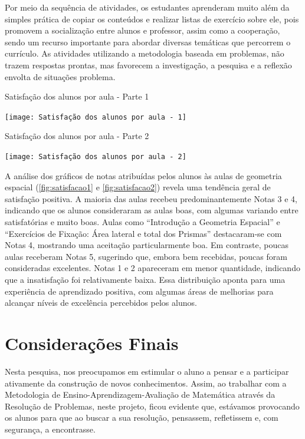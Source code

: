 Por meio da sequência de atividades, os estudantes aprenderam muito além da simples prática de copiar os conteúdos e realizar listas de exercício sobre ele, pois promovem a socialização entre alunos e professor, assim como a cooperação, sendo um recurso importante para abordar diversas temáticas que percorrem o currículo. As atividades utilizando a metodologia baseada em problemas, não trazem respostas prontas, mas favorecem a investigação, a pesquisa e a reflexão envolta de situações problema.

\begin{CenteredFigure}
    \caption{Satisfação dos alunos por aula - Parte 1} \label{fig:satisfacao1}
    \texttt{[image: Satisfação dos alunos por aula - 1]}
    \legend{\autoria}
\end{CenteredFigure}

\begin{CenteredFigure}
    \caption{Satisfação dos alunos por aula - Parte 2} \label{fig:satisfacao2}
    \texttt{[image: Satisfação dos alunos por aula - 2]}
    \legend{\autoria}
\end{CenteredFigure}

A análise dos gráficos de notas atribuídas pelos alunos às aulas de geometria espacial (\autoref{fig:satisfacao1} e \autoref{fig:satisfacao2}) revela uma tendência geral de satisfação positiva. A maioria das aulas recebeu predominantemente Notas 3 e 4, indicando que os alunos consideraram as aulas boas, com algumas variando entre satisfatórias e muito boas. Aulas como ``Introdução a Geometria Espacial'' e ``Exercícios de Fixação: Área lateral e total dos Prismas'' destacaram-se com Notas 4, mostrando uma aceitação particularmente boa. Em contraste, poucas aulas receberam Notas 5, sugerindo que, embora bem recebidas, poucas foram consideradas excelentes. Notas 1 e 2 apareceram em menor quantidade, indicando que a insatisfação foi relativamente baixa. Essa distribuição aponta para uma experiência de aprendizado positiva, com algumas áreas de melhorias para alcançar níveis de excelência percebidos pelos alunos.

\chapter{Considerações Finais} \label{cap:5_consideracoes}

Nesta pesquisa, nos preocupamos em  estimular o aluno a pensar e a participar ativamente da construção de novos conhecimentos. Assim, ao trabalhar com a Metodologia de Ensino-Aprendizagem-Avaliação de Matemática através da Resolução de Problemas, neste projeto, ficou evidente que, estávamos provocando os alunos para que ao buscar a sua resolução, pensassem, refletissem e, com segurança, a encontrasse.

